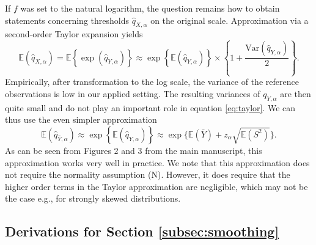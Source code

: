 \documentclass[12pt]{article}
\begin{document}
If $f$ was set to the natural logarithm, the question remains how to obtain statements concerning thresholds $\hat{q}_{X, \alpha}$ on the original scale. Approximation via a second-order Taylor expansion yields
\begin{equation}
\mathbb{E}(\hat{q}_{X, \alpha}) = \mathbb{E}\left\{\exp(\hat{q}_{Y, \alpha})\right\} \approx \exp\left\{\mathbb{E}(\hat{q}_{Y, \alpha})\right\} \times \left\{1 + \frac{\text{Var}(\hat{q}_{Y, \alpha})}{2} \right\}.
\label{eq:taylor}
\end{equation}
Empirically, after transformation to the log scale, the variance of the reference observations is low in our applied setting. The resulting variances of $q_{Y, \alpha}$ are then quite small and do not play an important role in equation \eqref{eq:taylor}. We can thus use the even simpler approximation
\begin{equation}
\mathbb{E}(\hat{q}_{\hat{Y}, \alpha}) \approx \exp\left\{\mathbb{E}(\hat{q}_{Y, \alpha})\right\} \approx \exp\{\mathbb{E}(\bar{Y}) + z_\alpha \sqrt{\mathbb{E}(S^2)}\}.
\end{equation}
As can be seen from Figures 2 and 3 from the main manuscript, this approximation works very well in practice. We note that this approximation does not require the normality assumption (N). However, it does require that the higher order terms in the Taylor approximation are negligible, which may not be the case e.g., for strongly skewed distributions. %

\subsection{Derivations for Section \ref{subsec:smoothing}}
\end{document}
